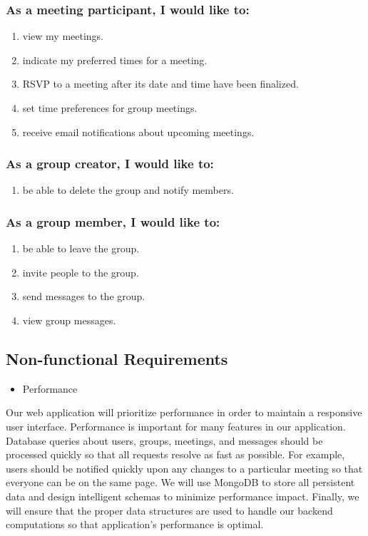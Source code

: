 \documentclass[12pt]{article}
\begin{document}
\subsubsection*{As a meeting participant, I would like to:}

\begin{enumerate}[nolistsep]
    \item view my meetings.
    \item indicate my preferred times for a meeting.
    \item RSVP to a meeting after its date and time have been finalized.
    \item set time preferences for group meetings.
    \item receive email notifications about upcoming meetings.
\end{enumerate}

\subsubsection*{As a group creator, I would like to:}
\begin{enumerate}[nolistsep]
    \item be able to delete the group and notify members.
\end{enumerate}

\subsubsection*{As a group member, I would like to:}
\begin{enumerate}[nolistsep]
    \item be able to leave the group.
    \item invite people to the group.
    \item send messages to the group.
    \item view group messages.
\end{enumerate}
\newpage
\subsection*{Non-functional Requirements}

\begin{itemize}
\item Performance
\end{itemize}

Our web application will prioritize performance in order to maintain a responsive user interface. Performance is important for many features in our application. Database queries about users, groups, meetings, and messages should be processed quickly so that all requests resolve as fast as possible. For example, users should be notified quickly upon any changes to a particular meeting so that everyone can be on the same page. We will use MongoDB to store all persistent data and design intelligent schemas to minimize performance impact. Finally, we will ensure that the proper data structures are used to handle our backend computations so that application’s performance is optimal.
\end{document}
